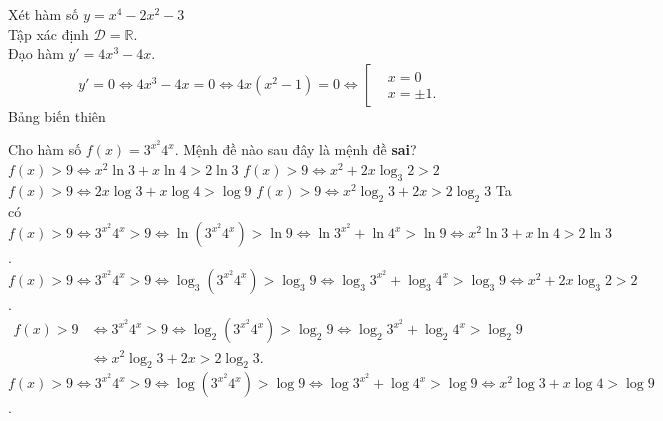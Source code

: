 \begin{ex}%
 {
 }
 \loigiai
  {
  Xét hàm số $y=x^4-2x^2-3$\\
  Tập xác định $\mathscr{D}=\mathbb{R}$.\\
  Đạo hàm $y'=4x^3-4x$.
  $$y'=0 \Leftrightarrow 4x^3-4x=0 \Leftrightarrow 4x(x^2-1)=0 \Leftrightarrow \left[\begin{aligned}&x=0 \\&x=\pm 1.\end{aligned}\right.$$
  Bảng biến thiên
  \begin{center}
  \end{center}
  }
\end{ex}

\begin{ex}%
 Cho hàm số $f(x)=3^{x^2}4^x$. Mệnh đề nào sau đây là mệnh đề \textbf{sai}?
 \choice
  {$f(x)>9 \Leftrightarrow x^2\ln3+x\ln4>2\ln3$}
  {$f(x)>9 \Leftrightarrow x^2+2x\log_3 2>2$}
  {\True $f(x)>9 \Leftrightarrow 2x\log3+x\log4>\log9$}
  {$f(x)>9 \Leftrightarrow x^2\log_2 3+2x>2\log_2 3$}
 \loigiai
  {
  Ta có\\
   $f(x)>9 \Leftrightarrow 3^{x^2}4^x >9 \Leftrightarrow \ln\left(3^{x^2}4^x\right)>\ln 9 \Leftrightarrow \ln 3^{x^2}+\ln 4^x > \ln 9 \Leftrightarrow x^2\ln 3 + x\ln 4 > 2\ln 3$.\\
   $f(x)>9\Leftrightarrow 3^{x^2}4^x >9\Leftrightarrow \log_3\left(3^{x^2}4^x\right)>\log_3 9 \Leftrightarrow \log_3 3^{x^2}+\log_3 4^x > \log_3 9\Leftrightarrow x^2 + 2x\log_3 2 > 2$.\\
   $\begin{aligned}f(x)>9&\Leftrightarrow 3^{x^2}4^x >9\Leftrightarrow \log_2\left(3^{x^2}4^x\right)>\log_2 9 \Leftrightarrow \log_2 3^{x^2}+\log_2 4^x > \log_2 9\\&\Leftrightarrow x^2\log_2 3 + 2x > 2\log_2 3.\end{aligned}$\\
   $f(x)>9\Leftrightarrow 3^{x^2}4^x >9\Leftrightarrow \log\left(3^{x^2}4^x\right)>\log 9 \Leftrightarrow \log 3^{x^2}+\log 4^x > \log 9\Leftrightarrow x^2\log 3 + x\log 4 > \log 9$.
  }
\end{ex}

